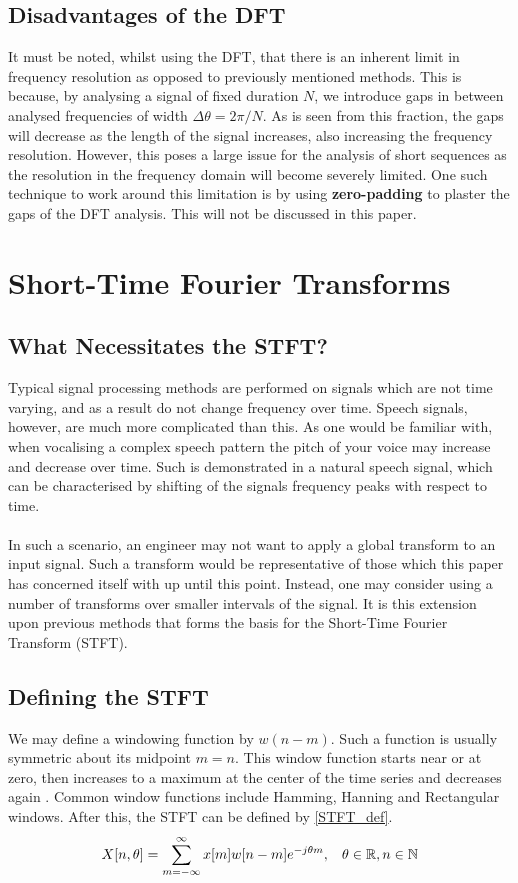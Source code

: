 \subsection{Disadvantages of the DFT}
It must be noted, whilst using the DFT, that there is an inherent limit in frequency resolution as opposed to previously mentioned methods. This is because, by analysing a signal of fixed duration $N$, we introduce gaps in between analysed frequencies of width $\Delta \theta = 2 \pi / N$. As is seen from this fraction, the gaps will decrease as the length of the signal increases, also increasing the frequency resolution. However, this poses a large issue for the analysis of short sequences as the resolution in the frequency domain will become severely limited. One such technique to work around this limitation is by using \textbf{zero-padding} to plaster the gaps of the DFT analysis. This will not be discussed in this paper. 

\section{Short-Time Fourier Transforms}
\subsection{What Necessitates the STFT?}
Typical signal processing methods are performed on signals which are not time varying, and as a result do not change frequency over time. Speech signals, however, are much more complicated than this. As one would be familiar with, when vocalising a complex speech pattern the pitch of your voice may increase and decrease over time. Such is demonstrated in a natural speech signal, which can be characterised by shifting of the signals frequency peaks with respect to time. \\ \\
In such a scenario, an engineer may not want to apply a global transform to an input signal. Such a transform would be representative of those which this paper has concerned itself with up until this point. Instead, one may consider using a number of transforms over smaller intervals of the signal. It is this extension upon previous methods that forms the basis for the Short-Time Fourier Transform (STFT).

\subsection{Defining the STFT}
We may define a windowing function by $w(n-m)$. Such a function is usually symmetric about its midpoint $m=n$. This window function starts near or at zero, then increases to a maximum at the center of the time series and decreases again \cite{heinzel2002spectrum}. Common window functions include Hamming, Hanning and Rectangular windows. After this, the STFT can be defined by \ref{STFT_def}.
\begin{equation}\label{STFT_def}
    X[n, \theta]  = \sum_{m=-\infty}^{\infty} x[m]w[n-m]e^{-j\theta m}, \hspace{3mm} \theta \in \mathbb{R},n \in \mathbb{N}
\end{equation}

